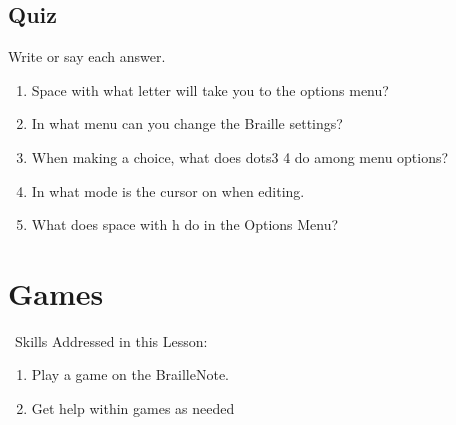 \documentclass[10pt,letterpaper,twoside]{report}
\begin{document}
{{{\subsection{Quiz}
Write or say each answer.
\begin{enumerate}
	\item Space with what letter will take you to the options menu?
	\item In what menu can you change the Braille settings?
	\item When making a choice, what does dots3 4 do among menu options?
	\item In what mode is the cursor on when editing.
	\item What does space with h do in the Options Menu?
\end{enumerate}
\clearpage
\section{ Games}
\
Skills Addressed in this Lesson:
\begin{enumerate}
	\item Play a game on the BrailleNote.
	\item Get help within games as needed

\end{enumerate}}}}
\end{document}

